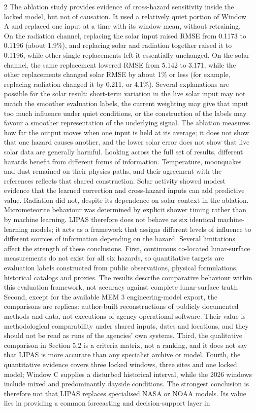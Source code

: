 \begin{multicols}{2}
The ablation study provides evidence of cross-hazard sensitivity inside the locked model, but not of causation. It used a relatively quiet portion of Window A and replaced one input at a time with its window mean, without retraining. On the radiation channel, replacing the solar input raised RMSE from 0.1173 to 0.1196 (about 1.9\%), and replacing solar and radiation together raised it to 0.1196, while other single replacements left it essentially unchanged. On the solar channel, the same replacement lowered RMSE from 5.142 to 3.171, while the other replacements changed solar RMSE by about 1\% or less (for example, replacing radiation changed it by 0.211, or 4.1\%). Several explanations are possible for the solar result: short-term variation in the live solar input may not match the smoother evaluation labels, the current weighting may give that input too much influence under quiet conditions, or the construction of the labels may favour a smoother representation of the underlying signal. The ablation measures how far the output moves when one input is held at its average; it does not show that one hazard causes another, and the lower solar error does not show that live solar data are generally harmful. Looking across the full set of results, different hazards benefit from different forms of information. Temperature, moonquakes and dust remained on their physics paths, and their agreement with the references reflects that shared construction. Solar activity showed modest evidence that the learned correction and cross-hazard inputs can add predictive value. Radiation did not, despite its dependence on solar context in the ablation. Micrometeorite behaviour was determined by explicit shower timing rather than by machine learning. LIPAS therefore does not behave as six identical machine-learning models; it acts as a framework that assigns different levels of influence to different sources of information depending on the hazard. Several limitations affect the strength of these conclusions. First, continuous co-located lunar-surface measurements do not exist for all six hazards, so quantitative targets are evaluation labels constructed from public observations, physical formulations, historical catalogs and proxies. The results describe comparative behaviour within this evaluation framework, not accuracy against complete lunar-surface truth. Second, except for the available MEM 3 engineering-model export, the comparisons are replicas: author-built reconstructions of publicly documented methods and data, not executions of agency operational software. Their value is methodological comparability under shared inputs, dates and locations, and they should not be read as runs of the agencies' own systems. Third, the qualitative comparison in Section 5.2 is a criteria matrix, not a ranking, and it does not say that LIPAS is more accurate than any specialist archive or model. Fourth, the quantitative evidence covers three locked windows, three sites and one locked model; Window C supplies a disturbed historical interval, while the 2026 windows include mixed and predominantly dayside conditions. The strongest conclusion is therefore not that LIPAS replaces specialised NASA or NOAA models. Its value lies in providing a common forecasting and decision-support layer in 
\end{multicols}
